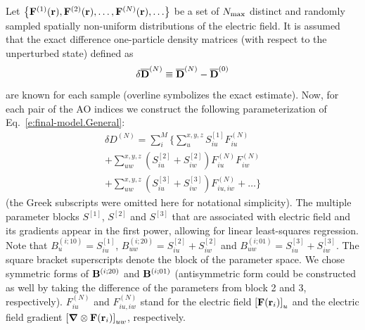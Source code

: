\documentclass[aip,amsmath,amssymb,reprint,floatfix]{revtex4-1}
\newcommand{\BM}[1]{\bm{#1}}
\begin{document}
Let  
$\left\{ {\bf F}^{(1)}({\bf r}), {\bf F}^{(2)}({\bf r}), \ldots, {\bf F}^{(N)}({\bf r}), \ldots \right\}$ 
be a set of $N_{\rm max}$ distinct and randomly sampled 
spatially non\hyp{}uniform distributions of the electric field. It is assumed that
the exact difference one\hyp{}particle density matrices (with respect to the unperturbed state)
defined as
%
\begin{equation}
 \delta \overline{\bf D}^{(N)} \equiv \overline{\bf D}^{(N)} - \overline{\bf D}^{(0)}
\end{equation}
%
are known for each sample (overline symbolizes the exact estimate).
Now, for each pair of the AO indices we construct the following 
parameterization of Eq.~\eqref{e:final-model.General}:
%
\begin{multline}\label{e:final-model.General.Parameters}
 \delta D^{(N)} = \sum_{i }^M \Big\{ 
                              \sum_u^{x,y,z} S^{[1]}_{iu} F_{iu}^{(N)} \\
                +             \sum_{uw}^{x,y,z} \left( S^{[2]}_{iu} + S^{[2]}_{iw} \right) F_{iu}^{(N)} F_{iw}^{(N)} \\
                +             \sum_{uw}^{x,y,z} \left( S^{[3]}_{iu} + S^{[3]}_{iw}\right) F_{iu,iw}^{(N)}
                        + \ldots \Big\}
\end{multline}
%
(the Greek subscripts were omitted here for notational simplicity).
The multiple parameter blocks 
$S^{[1]}$, $S^{[2]}$ and $S^{[3]}$ that are associated with electric field and its gradients
appear in the first power, allowing for linear least\hyp{}squares regression.
Note that $B_u^{(i;10)} = S^{[1]}_{iu}$, $B_{uw}^{(i;20)} = S^{[2]}_{iu} + S^{[2]}_{iw}$
and $B_{uw}^{(i;01)} = S^{[3]}_{iu} + S^{[3]}_{iw}$. The square bracket superscripts 
denote the block of the parameter space. We chose symmetric forms of ${\bf B}^{(i;20)}$
and ${\bf B}^{(i;01)}$ (antisymmetric form could be constructed as well by taking the difference
of the parameters from block 2 and 3, respectively). $F_{iu}^{(N)}$ and $F_{iu,iw}^{(N)}$ 
stand for the electric field $\left[ {\bf F}({\bf r}_i)\right]_u$ and the electric field
gradient $\left[ {\BM \nabla} \otimes {\bf F}({\bf r}_i) \right]_{uw}$, respectively.
\end{document}
